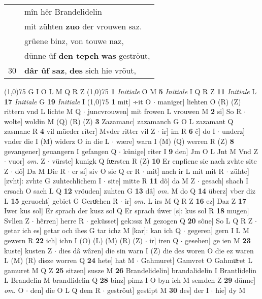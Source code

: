 \documentclass[8pt,a4paper,notitlepage]{article}
\begin{document}
\begin{table}[ht]
\begin{minipage}[t]{0.5\linewidth}
\begin{tabular}{rl}
 & mîn hêr Brandelidelin\\ 
 & mit zühten \textbf{zuo} der vrouwen saz.\\ 
 & grüene binz, von touwe naz,\\ 
 & dünne ûf \textbf{den tepch} \textbf{was} geströut,\\ 
30 & \textbf{dâr ûf saz}, \textbf{des} sich hie vröut,\\ 
\end{tabular}
\scriptsize
\line(1,0){75} \newline
G I O L M Q R Z \newline
\line(1,0){75} \newline
\textbf{1} \textit{Initiale} O M  \textbf{5} \textit{Initiale} I Q R Z  \textbf{11} \textit{Initiale} L  \textbf{17} \textit{Initiale} G  \textbf{19} \textit{Initiale} I  \newline
\line(1,0){75} \newline
\textbf{1} mit] ÷it O  $\cdot$ maniger] liehten O (R) (Z) rittern vnd L lichte M Q  $\cdot$ juncvrouwen] mit frowen L vrouwen M \textbf{2} si] So R  $\cdot$ wolte] woldin M (Q) (R) (Z) \textbf{3} Zazamanc] zazamanch G O L zazamant Q zasmanc R \textbf{4} vil müeder rîter] Mvder ritter vil Z  $\cdot$ ir] im R \textbf{6} ê] do I  $\cdot$ underz] vnder die I (M) widerz O in die L  $\cdot$ wære] warn I (M) (Q) werren R (Z) \textbf{8} gevangener] geuangern I gefangen Q  $\cdot$ künige] riter I \textbf{9} den] Jm O L Jnt M Vnd Z  $\cdot$ vuor] \textit{om.} Z  $\cdot$ vürste] kunigk Q fᵫrsten R (Z) \textbf{10} Er enpfienc sie nach zvhte site Z  $\cdot$ dô] Da M Die R  $\cdot$ er si] siv O sie Q er R  $\cdot$ mit] nach ir L mit mit R  $\cdot$ zühte] [zvht]: zvhte G zuhtechlichem I  $\cdot$ site] mitte R \textbf{11} dô] da M Z  $\cdot$ gesach] shach I ersach O sach L Q \textbf{12} vröuden] zuhten G \textbf{13} dâ] \textit{om.} M do Q \textbf{14} überz] vber diz L \textbf{15} geruocht] gebiet G Geruͦchen R  $\cdot$ ir] \textit{om.} L irs M Q R Z \textbf{16} ez] Daz Z \textbf{17} Iwer kus sol] Er sprach der kusz sol Q Er sprach úwer [s]: kus sol R \textbf{18} mugen] Svllen Z  $\cdot$ hêrren] herre R  $\cdot$ geküsset] gek:ssz M gezogen Q \textbf{20} sône] So L Q R Z  $\cdot$ getar ich es] getar och ihes G tar ichz M [kar]: kan ich Q  $\cdot$ gegeren] gern I L M gewern R \textbf{22} ich] ichn I (O) (L) (M) (R) (Z)  $\cdot$ ir] iren Q  $\cdot$ gesehen] ge ien M \textbf{23} kuste] kusten Z  $\cdot$ dies dâ wâren] die sin warn I (Z) die des woren O die ez waren L (M) (R) disze worren Q \textbf{24} hete] hat M  $\cdot$ Gahmuret] Gamvret O Gahmuͯret L gamuret M Q Z \textbf{25} sitzen] susze M \textbf{26} Brandelidelin] brandalidelin I Brantlidelin L Brandelin M brandlidelin Q \textbf{28} binz] pimz I O byn ich M semden Z \textbf{29} dünne] \textit{om.} O  $\cdot$ den] die O L Q dem R  $\cdot$ geströut] gestipt M \textbf{30} des] der I  $\cdot$ hie] dy M \newline

\end{minipage}
\end{table}
\end{document}
